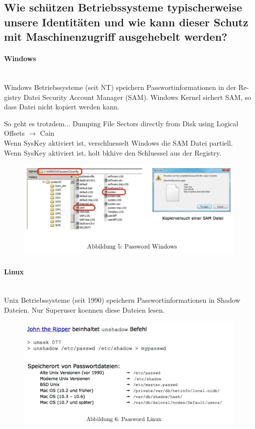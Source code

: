 \documentclass[a4paper, 11pt, nofootinbib]{article}
\begin{document}
\newpage

\subsection{Wie schützen Betriebssysteme typischerweise unsere Identitäten und wie kann dieser Schutz mit Maschinenzugriff ausgehebelt werden?}
\paragraph{Windows}\mbox{}\\
Windows Betriebssysteme (seit NT) speichern Passwortinformationen in der Re-
gistry Datei Security Account Manager (SAM). Windows Kernel sichert SAM,
so dass Datei nicht kopiert werden kann.

So geht es trotzdem...
Dumping File Sectors directly from Disk using Logical Offsets $\rightarrow$ Cain\\
Wenn SysKey aktiviert ist, verschluesselt Windows die SAM Datei partiell.\\
Wenn SysKey aktiviert ist, holt bkhive den Schluessel aus der Registry.\\

\begin{figure}[htb]
	\centering
	\includegraphics[keepaspectratio=true,height=12\baselineskip]{SAM_Windows.jpg}
\end{figure}

\paragraph{Linux}\mbox{}\\
Unix Betriebssysteme (seit 1990) speichern Passwortinformationen in Shadow
Dateien. Nur Superuser koennen diese Dateien lesen.

\begin{figure}[htb]
	\centering
	\includegraphics[keepaspectratio=true,height=12\baselineskip]{password_linux.jpg}
\end{figure}
\end{document}

